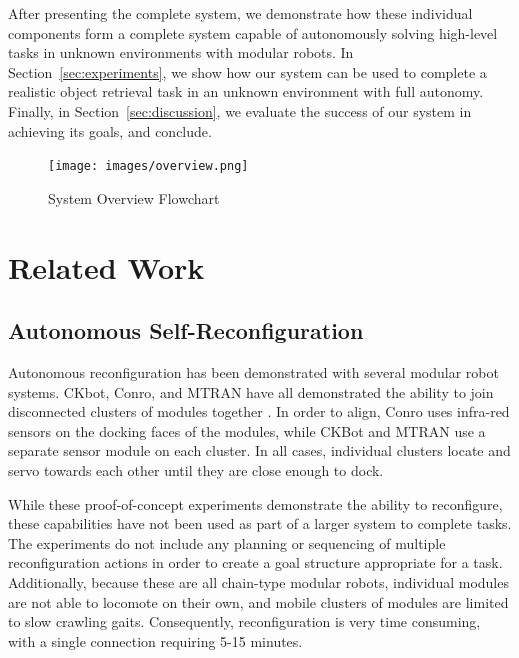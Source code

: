 \documentclass[conference]{IEEEtran}
\begin{document}
After presenting the complete system, we demonstrate how these individual components form a complete system capable of autonomously solving high-level tasks in unknown environments with modular robots.  In Section~\ref{sec:experiments}, we show how our system can be used to complete a realistic object retrieval task in an unknown environment with full autonomy.  Finally, in Section~\ref{sec:discussion}, we evaluate the success of our system in achieving its goals, and conclude.
%
\begin{figure}
\begin{center}
\texttt{[image: images/overview.png]}
\caption{System Overview Flowchart}
\label{fig:overview}
\end{center}
\end{figure} 
%

\section{Related Work}\label{sec:related-work}
\subsection{Autonomous Self-Reconfiguration}
\label{autonomous-self-reconfiguration}
%
Autonomous reconfiguration has been demonstrated with several modular robot systems. CKbot, Conro, and MTRAN have all demonstrated the ability to join disconnected clusters of modules together \cite{Yim2007, Rubenstein2004,Murata2006}. In order to align, Conro uses infra-red sensors on the docking faces of the modules, while CKBot and MTRAN use a separate sensor module on each cluster.  In all cases, individual clusters locate and servo towards each other until they are close enough to dock.

While these proof-of-concept experiments demonstrate the ability to reconfigure, these capabilities have not been used as part of a larger system to complete tasks. The experiments do not include any planning or sequencing of multiple reconfiguration actions in order to create a goal structure appropriate for a task.  Additionally, because these are all chain-type modular robots, individual modules are not able to locomote on their own, and mobile clusters of modules are limited to slow crawling gaits.  Consequently, reconfiguration is very time consuming, with a single connection requiring 5-15 minutes.
\end{document}
